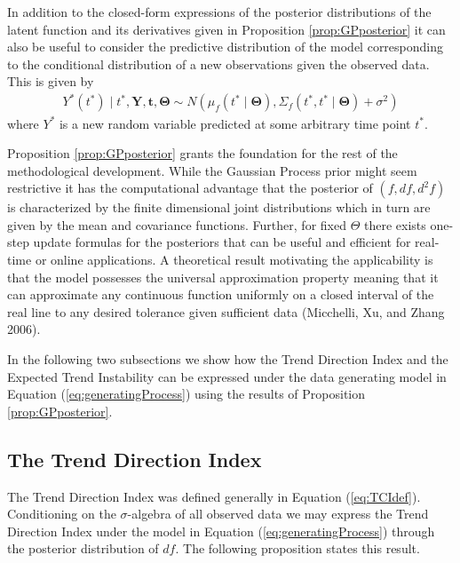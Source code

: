 \documentclass[
  11pt,
]{article}
\theoremstyle{nonumberplain}
\begin{document}
In addition to the closed-form expressions of the posterior
distributions of the latent function and its derivatives given in
Proposition \ref{prop:GPposterior} it can also be useful to consider the
predictive distribution of the model corresponding to the conditional
distribution of a new observations given the observed data. This is
given by \begin{align}
Y^\ast(t^\ast) \mid t^\ast, \mathbf{Y}, \mathbf{t}, \bm{\Theta} \sim N\left(\mu_{f}(t^\ast \mid \bm{\Theta}), \Sigma_{f}(t^\ast, t^\ast \mid \bm{\Theta}) + \sigma^2\right)\label{eq:PPD}
\end{align} where \(Y^\ast\) is a new random variable predicted at some
arbitrary time point \(t^\ast\).

Proposition \ref{prop:GPposterior} grants the foundation for the rest of
the methodological development. While the Gaussian Process prior might
seem restrictive it has the computational advantage that the posterior
of \((f, df, d^2\!f)\) is characterized by the finite dimensional joint
distributions which in turn are given by the mean and covariance
functions. Further, for fixed \(\Theta\) there exists one-step update
formulas for the posteriors that can be useful and efficient for
real-time or online applications. A theoretical result motivating the
applicability is that the model possesses the universal approximation
property meaning that it can approximate any continuous function
uniformly on a closed interval of the real line to any desired tolerance
given sufficient data (Micchelli, Xu, and Zhang 2006).

In the following two subsections we show how the Trend Direction Index
and the Expected Trend Instability can be expressed under the data
generating model in Equation (\ref{eq:generatingProcess}) using the
results of Proposition \ref{prop:GPposterior}.

\hypertarget{the-trend-direction-index}{%
\subsection{The Trend Direction Index}\label{the-trend-direction-index}}

The Trend Direction Index was defined generally in Equation
(\ref{eq:TCIdef}). Conditioning on the \(\sigma\)-algebra of all
observed data we may express the Trend Direction Index under the model
in Equation (\ref{eq:generatingProcess}) through the posterior
distribution of \(df\). The following proposition states this result.
\end{document}
